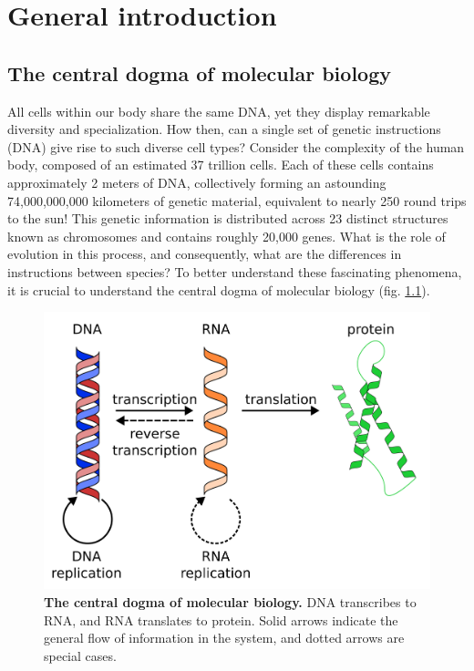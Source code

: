 \chapter{General introduction}\thumbforchapter
\newpage

\section{The central dogma of molecular biology}

All cells within our body share the same DNA, yet they display remarkable diversity and specialization. How then, can a single set of genetic instructions (DNA) give rise to such diverse cell types? Consider the complexity of the human body, composed of an estimated 37 trillion cells\cite{Bianconi2013,Sender2016}. Each of these cells contains approximately 2 meters of DNA, collectively forming an astounding 74,000,000,000 kilometers of genetic material, equivalent to nearly 250 round trips to the sun! This genetic information is distributed across 23 distinct structures known as chromosomes and contains roughly 20,000 genes. What is the role of evolution in this process, and consequently, what are the differences in instructions between species? To better understand these fascinating phenomena, it is crucial to understand the central dogma of molecular biology (fig. \ref{fig:central_dogma}).

\begin{figure}[H]
    \center
    \includegraphics[width=0.7\linewidth]{ch.introduction/imgs/central_dogma.png}
    \caption{\textbf{The central dogma of molecular biology.} DNA transcribes to RNA, and RNA translates to protein. Solid arrows indicate the general flow of information in the system, and dotted arrows are special cases.}
    \label{fig:central_dogma}
\end{figure}


